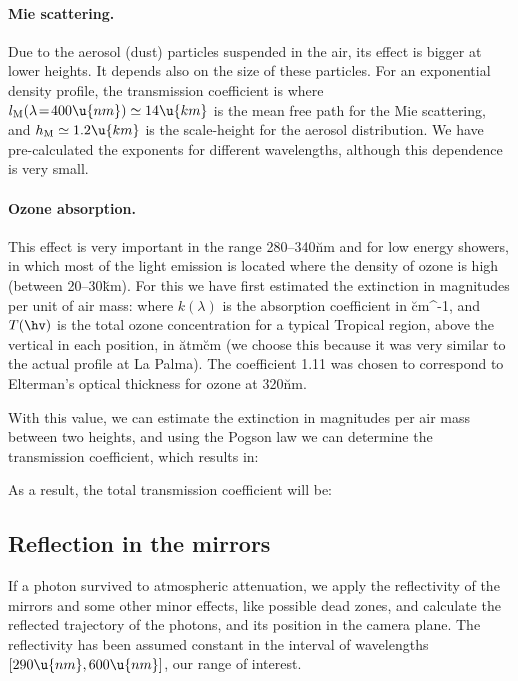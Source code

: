 \paragraph{Mie scattering.} Due to the aerosol (dust)
particles suspended in the air, its effect is bigger at lower heights.
It depends also on the size of these particles. For an exponential
density profile, the transmission coefficient is
%
\Mieeq
%
where $l_{\mathrm{M}}(\lambda\!=\!400\u{nm}) \simeq 14\u{km}$ is the
mean free path for the Mie scattering, and $h_{\mathrm{M}} \simeq
1.2\u{km}$ is the scale-height for the aerosol distribution. We have
pre-calculated the exponents for different wavelengths, although this
dependence is very small.
  
\paragraph{Ozone absorption.} This effect is very important in the
range 280--340\u{nm} and for low energy showers, in which most of the
\Cherenkov light emission is located where the density of ozone is
high (between 20--30\u{km}). For this we have first estimated the
extinction in magnitudes per unit of air mass:
%
\amagneq
%
where $k(\lambda)$ is the absorption coefficient in \u{cm^{-1}}, and
$T(\hv)$ is the total ozone concentration for a typical Tropical
region, above the vertical in each position, in \u{atm}\u{cm} (we
choose this because it was very similar to the actual profile at La
Palma). The coefficient 1.11 was chosen to correspond to Elterman's
optical thickness for ozone at 320\u{nm}\cite{Elterman:book}.

With this value, we can estimate the extinction in magnitudes per air
mass between two heights, and using the Pogson law we can determine
the transmission coefficient, which results in:
%
\Ozoneeq

As a result, the total transmission coefficient will be:
%
\TotalTransmissioneq

\subsection{Reflection in the mirrors}

If a photon survived to atmospheric attenuation, we apply the
reflectivity of the mirrors and some other minor effects, like
possible dead zones, and calculate the reflected trajectory of the
photons, and its position in the camera plane. The reflectivity has
been assumed constant in the interval of wavelengths
$[290\u{nm},600\u{nm}]$, our range of interest.

